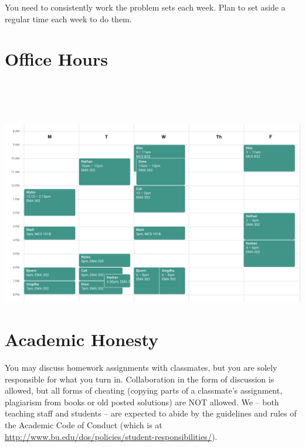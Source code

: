 \documentclass[11pt]{article}
\begin{document}
You need to consistently work the problem sets each week.   Plan
  to set aside a regular time each week to do them.

\newpage

\section*{Office Hours}

~\\~\\~\\

\centerline{\includegraphics[width=\textwidth]{office-hours-schedule.png}}

\newpage

\section*{Academic Honesty}

You may discuss homework assignments with classmates, but you are 
solely responsible for what you turn in. Collaboration in the form of
discussion is allowed, but all forms of cheating (copying parts of a
classmate's assignment, plagiarism from books or old posted solutions)
are NOT allowed. We -- both teaching staff and students -- are expected
to abide by the guidelines and rules of the Academic Code of Conduct
(which is at
\url{http://www.bu.edu/dos/policies/student-responsibilities/}).
\end{document}
